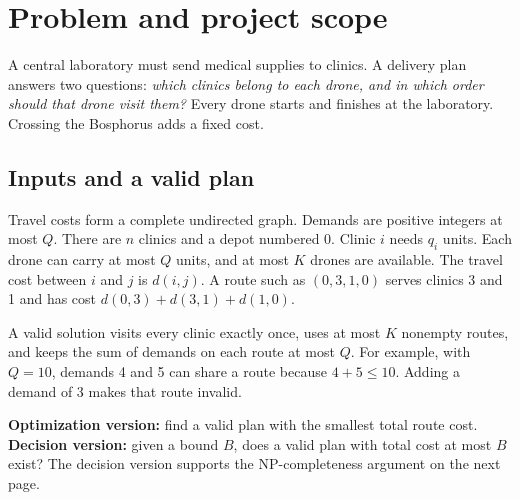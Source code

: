 \maketitle\vspace{-0.7cm}
\begin{abstract}
This project compares two ways to plan medical deliveries with capacity-limited drones: a Genetic
Algorithm (GA) and Tabu Search (TS). A Clarke--Wright savings heuristic provides a fast starting
solution. The main evaluation uses the four required CVRPLIB benchmarks and a generated instance
with 100 clinics. Each stochastic method has ten recorded runs and the same time budget per
instance. In these saved experiments, TS gives lower mean costs than the pure GA on every main
instance. Both methods reach the exact optimum in all runs on nine tiny test cases. The report
explains the required reductions, Split dynamic program and running-time analysis using small
examples. All tables and plots come from existing experiment files.
\end{abstract}

\section{Problem and project scope}
A central laboratory must send medical supplies to clinics. A delivery plan answers two questions:
\emph{which clinics belong to each drone, and in which order should that drone visit them?}
Every drone starts and finishes at the laboratory. Crossing the Bosphorus adds a fixed cost.

\subsection*{Inputs and a valid plan}
Travel costs form a complete undirected graph. Demands are positive integers at most $Q$.
There are $n$ clinics and a depot numbered $0$. Clinic $i$ needs $q_i$ units. Each drone can carry
at most $Q$ units, and at most $K$ drones are available. The travel cost between $i$ and $j$ is
$d(i,j)$. A route such as $(0,3,1,0)$ serves clinics 3 and 1 and has cost
$d(0,3)+d(3,1)+d(1,0)$.

A valid solution visits every clinic exactly once, uses at most $K$ nonempty routes, and keeps the
sum of demands on each route at most $Q$. For example, with $Q=10$, demands 4 and 5 can share a
route because $4+5\le10$. Adding a demand of 3 makes that route invalid.

\textbf{Optimization version:} find a valid plan with the smallest total route cost.
\textbf{Decision version:} given a bound $B$, does a valid plan with total cost at most $B$ exist?
The decision version supports the NP-completeness argument on the next page.

